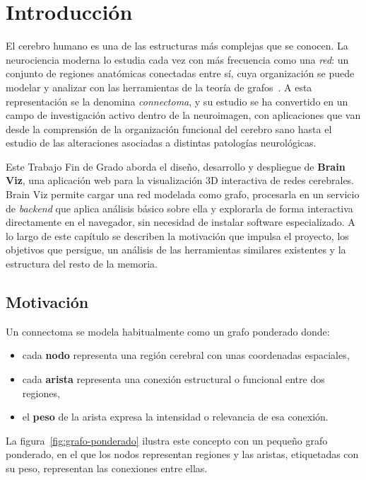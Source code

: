 \chapter{Introducción}

El cerebro humano es una de las estructuras más complejas que se conocen. La neurociencia moderna
lo estudia cada vez con más frecuencia como una \textit{red}: un conjunto de regiones anatómicas
conectadas entre sí, cuya organización se puede modelar y analizar con las herramientas de la
teoría de grafos~\cite{bullmore2009}. A esta representación se la denomina \textit{connectoma}, y
su estudio se ha convertido en un campo de investigación activo dentro de la neuroimagen, con
aplicaciones que van desde la comprensión de la organización funcional del cerebro sano hasta el
estudio de las alteraciones asociadas a distintas patologías neurológicas.

Este Trabajo Fin de Grado aborda el diseño, desarrollo y despliegue de \textbf{Brain Viz}, una
aplicación web para la visualización 3D interactiva de redes cerebrales. Brain Viz permite cargar
una red modelada como grafo, procesarla en un servicio de \textit{backend} que aplica análisis
básico sobre ella y explorarla de forma interactiva directamente en el navegador, sin necesidad de
instalar software especializado. A lo largo de este capítulo se describen la motivación que impulsa
el proyecto, los objetivos que persigue, un análisis de las herramientas similares existentes y la
estructura del resto de la memoria.

\section{Motivación}

Un connectoma se modela habitualmente como un grafo ponderado donde:

\begin{itemize}
	\item cada \textbf{nodo} representa una región cerebral con unas coordenadas espaciales,
	\item cada \textbf{arista} representa una conexión estructural o funcional entre dos regiones,
	\item el \textbf{peso} de la arista expresa la intensidad o relevancia de esa conexión.
\end{itemize}

La figura~\ref{fig:grafo-ponderado} ilustra este concepto con un pequeño grafo ponderado, en el que
los nodos representan regiones y las aristas, etiquetadas con su peso, representan las conexiones
entre ellas.

